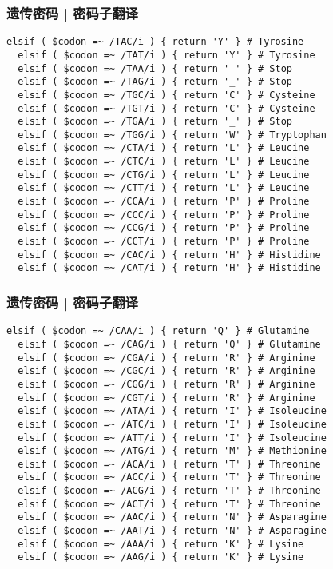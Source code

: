 \begin{frame}[fragile]
  \frametitle{遗传密码 | 密码子翻译}
\begin{lstlisting}[firstnumber=16,basicstyle=\footnotesize\tt,numberstyle=\scriptsize]
  elsif ( $codon =~ /TAC/i ) { return 'Y' } # Tyrosine
  elsif ( $codon =~ /TAT/i ) { return 'Y' } # Tyrosine
  elsif ( $codon =~ /TAA/i ) { return '_' } # Stop
  elsif ( $codon =~ /TAG/i ) { return '_' } # Stop
  elsif ( $codon =~ /TGC/i ) { return 'C' } # Cysteine
  elsif ( $codon =~ /TGT/i ) { return 'C' } # Cysteine
  elsif ( $codon =~ /TGA/i ) { return '_' } # Stop
  elsif ( $codon =~ /TGG/i ) { return 'W' } # Tryptophan
  elsif ( $codon =~ /CTA/i ) { return 'L' } # Leucine
  elsif ( $codon =~ /CTC/i ) { return 'L' } # Leucine
  elsif ( $codon =~ /CTG/i ) { return 'L' } # Leucine
  elsif ( $codon =~ /CTT/i ) { return 'L' } # Leucine
  elsif ( $codon =~ /CCA/i ) { return 'P' } # Proline
  elsif ( $codon =~ /CCC/i ) { return 'P' } # Proline
  elsif ( $codon =~ /CCG/i ) { return 'P' } # Proline
  elsif ( $codon =~ /CCT/i ) { return 'P' } # Proline
  elsif ( $codon =~ /CAC/i ) { return 'H' } # Histidine
  elsif ( $codon =~ /CAT/i ) { return 'H' } # Histidine
\end{lstlisting}
\end{frame}

\begin{frame}[fragile]
  \frametitle{遗传密码 | 密码子翻译}
\begin{lstlisting}[firstnumber=34,basicstyle=\footnotesize\tt,numberstyle=\scriptsize]
  elsif ( $codon =~ /CAA/i ) { return 'Q' } # Glutamine
  elsif ( $codon =~ /CAG/i ) { return 'Q' } # Glutamine
  elsif ( $codon =~ /CGA/i ) { return 'R' } # Arginine
  elsif ( $codon =~ /CGC/i ) { return 'R' } # Arginine
  elsif ( $codon =~ /CGG/i ) { return 'R' } # Arginine
  elsif ( $codon =~ /CGT/i ) { return 'R' } # Arginine
  elsif ( $codon =~ /ATA/i ) { return 'I' } # Isoleucine
  elsif ( $codon =~ /ATC/i ) { return 'I' } # Isoleucine
  elsif ( $codon =~ /ATT/i ) { return 'I' } # Isoleucine
  elsif ( $codon =~ /ATG/i ) { return 'M' } # Methionine
  elsif ( $codon =~ /ACA/i ) { return 'T' } # Threonine
  elsif ( $codon =~ /ACC/i ) { return 'T' } # Threonine
  elsif ( $codon =~ /ACG/i ) { return 'T' } # Threonine
  elsif ( $codon =~ /ACT/i ) { return 'T' } # Threonine
  elsif ( $codon =~ /AAC/i ) { return 'N' } # Asparagine
  elsif ( $codon =~ /AAT/i ) { return 'N' } # Asparagine
  elsif ( $codon =~ /AAA/i ) { return 'K' } # Lysine
  elsif ( $codon =~ /AAG/i ) { return 'K' } # Lysine
\end{lstlisting}
\end{frame}


